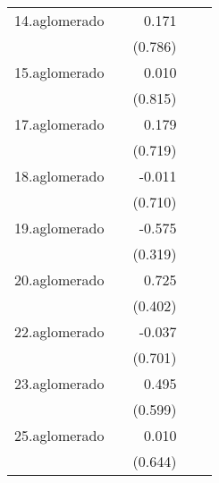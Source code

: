{\begin{longtable}{l*{4}{D{.}{.}{-1}}}
\addlinespace
14.aglomerado&                     &       0.171         &                     &                     \\
            &                     &     (0.786)         &                     &                     \\
\addlinespace
15.aglomerado&                     &       0.010         &                     &                     \\
            &                     &     (0.815)         &                     &                     \\
\addlinespace
17.aglomerado&                     &       0.179         &                     &                     \\
            &                     &     (0.719)         &                     &                     \\
\addlinespace
18.aglomerado&                     &      -0.011         &                     &                     \\
            &                     &     (0.710)         &                     &                     \\
\addlinespace
19.aglomerado&                     &      -0.575         &                     &                     \\
            &                     &     (0.319)         &                     &                     \\
\addlinespace
20.aglomerado&                     &       0.725         &                     &                     \\
            &                     &     (0.402)         &                     &                     \\
\addlinespace
22.aglomerado&                     &      -0.037         &                     &                     \\
            &                     &     (0.701)         &                     &                     \\
\addlinespace
23.aglomerado&                     &       0.495         &                     &                     \\
            &                     &     (0.599)         &                     &                     \\
\addlinespace
25.aglomerado&                     &       0.010         &                     &                     \\
            &                     &     (0.644)         &                     &                     \\

\end{longtable}}
